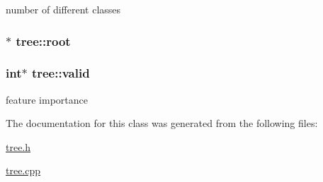number of different classes \hypertarget{classtree_ad397d4906e47149b98f769b3e81473ee}{
\subsubsection[{root}]{$\ast$ tree\+::root\hspace{0.3cm}{\ttfamily [protected]}}}\label{classtree_ad397d4906e47149b98f769b3e81473ee}
\hypertarget{classtree_afa8e539406e1f8b373b147682e3a8196}{
\subsubsection[{valid}]{\setlength{\rightskip}{0pt plus 5cm}int$\ast$ tree\+::valid}}\label{classtree_afa8e539406e1f8b373b147682e3a8196}
feature importance 

The documentation for this class was generated from the following files\+:\begin{DoxyCompactItemize}
\item 
\hyperlink{tree_8h}{tree.\+h}\item 
\hyperlink{tree_8cpp}{tree.\+cpp}\end{DoxyCompactItemize}
